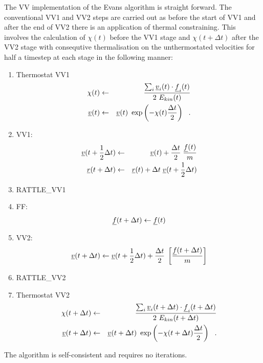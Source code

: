 The VV implementation of the Evans algorithm is straight forward.
The conventional VV1 and VV2 steps are carried out as before
the start of VV1 and after the end of VV2 there is an application of
thermal constraining.  This involves the calculation of $\chi (t)$
before the VV1 stage and $\chi (t+\Delta t)$ after the VV2 stage
with consequtive thermalisation on the unthermostated velocities
for half a timestep at each stage in the following manner:
\begin{enumerate}
\item Thermostat VV1
\begin{eqnarray}
\chi (t) &\leftarrow& \frac {\sum_{i} \mbox{$\underline{v}$}_{i}(t) \cdot \mbox{$\underline{f}$}_{i}(t)} {2~E_{kin}(t)} \nonumber \\
\mbox{$\underline{v}$}(t) &\leftarrow& \mbox{$\underline{v}$}(t)~\exp \left( -\chi (t) {\Delta t \over 2} \right)~~.
\end{eqnarray}
\item VV1:
\begin{eqnarray}
\mbox{$\underline{v}$}(t + {1 \over 2} \Delta t) &\leftarrow& \mbox{$\underline{v}$}(t) +
{\Delta t \over 2} \; {\mbox{$\underline{f}$}(t) \over m} \nonumber \\
\mbox{$\underline{r}$}(t + \Delta t) &\leftarrow& \mbox{$\underline{r}$}(t) + \Delta t \;
\mbox{$\underline{v}$}(t + {1 \over 2} \Delta t)
\end{eqnarray}
\item RATTLE\_VV1
\item FF:
\begin{equation}
\mbox{$\underline{f}$}(t + \Delta t) \leftarrow \mbox{$\underline{f}$}(t)
\end{equation}
\item VV2:
\begin{equation}
\mbox{$\underline{v}$}(t + \Delta t) \leftarrow \mbox{$\underline{v}$}(t + {1 \over 2} \Delta t) +
{\Delta t \over 2} \; \left[{\mbox{$\underline{f}$}(t + \Delta t) \over m} \right]
\end{equation}
\item RATTLE\_VV2
\item Thermostat VV2
\begin{eqnarray}
\chi (t + \Delta t) &\leftarrow& \frac {\sum_{i} \mbox{$\underline{v}$}_{i}(t +
\Delta t) \cdot \mbox{$\underline{f}$}_{i}(t + \Delta t)} {2~E_{kin}(t + \Delta t)} \nonumber \\
\mbox{$\underline{v}$}(t + \Delta t) &\leftarrow& \mbox{$\underline{v}$}(t + \Delta t)~
\exp \left( -\chi (t + \Delta t) {\Delta t \over 2} \right)~~.
\end{eqnarray}
\end{enumerate}
The algorithm is self-consistent and requires no iterations.

